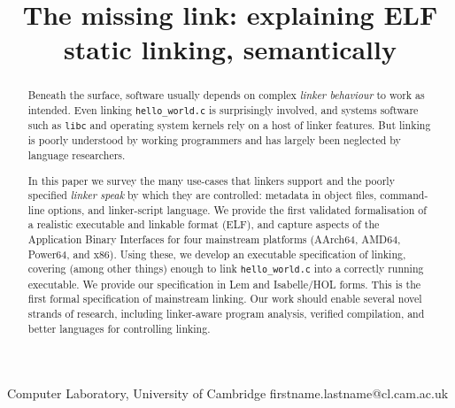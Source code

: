 \documentclass[preprint,10pt]{sigplanconf-pldi16}
\begin{document}
\title{The missing link: explaining ELF static linking, semantically}
           {Computer Laboratory, University of Cambridge}
           {firstname.lastname@cl.cam.ac.uk}

\maketitle

\begin{abstract}
Beneath the surface, software usually depends on complex \emph{linker behaviour} to work as intended.  Even linking \texttt{hello\_world.c} is surprisingly involved, and systems software such as \texttt{libc} and operating system kernels rely on a host of linker features.  But linking is poorly understood by working programmers and has largely been neglected by language researchers.


In this paper we survey the many use-cases that linkers support and the poorly specified \emph{linker speak} by which they are controlled: metadata in object files, command-line options, and linker-script language.  We provide the first validated formalisation of a realistic executable and linkable format (ELF), and capture aspects of the Application Binary Interfaces for four mainstream platforms (AArch64, AMD64, Power64, and x86).  Using these, we develop an executable specification of linking, covering (among other things) enough to link \texttt{hello\_world.c} into a correctly running executable.  We provide our specification in Lem and Isabelle/HOL forms.  This is the first formal specification of mainstream linking. Our work should enable several novel strands of research, including linker-aware program analysis, verified compilation, and better languages for controlling linking.

% 
% 
%   
% 
% 
% 
% 
% 
% 
% 
% 
% 
% 
% 


\end{abstract}
\end{document}
